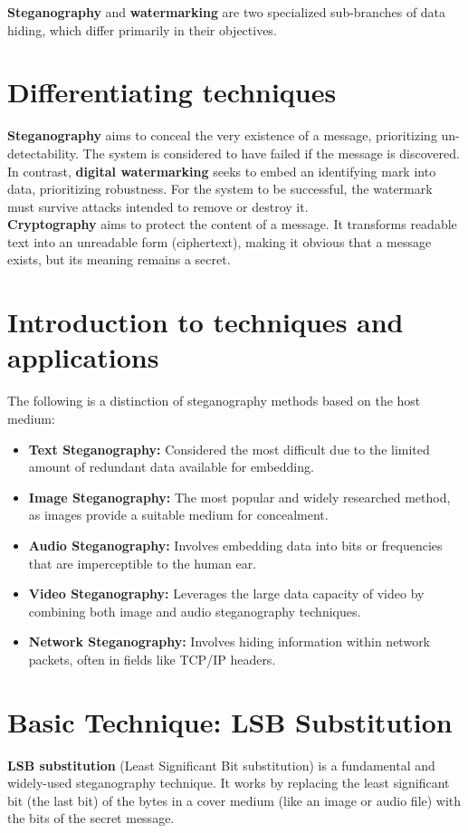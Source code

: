     \textbf{Steganography} and \textbf{watermarking} are two specialized
    sub-branches of data hiding, which differ primarily in their objectives.
\section{Differentiating techniques}
    \textbf{Steganography} aims to conceal the very existence of a message,
    prioritizing un-detectability. The system is considered to have failed if
    the message is discovered.\\
    
    In contrast, \textbf{digital watermarking} seeks to embed an identifying
    mark into data, prioritizing robustness. For the system to be successful,
    the watermark must survive attacks intended to remove or destroy it.\\
    
    \textbf{Cryptography} aims to protect the content of a message. It
    transforms readable text into an unreadable form (ciphertext), making it
    obvious that a message exists, but its meaning remains a secret.
\section{Introduction to techniques and applications}
    The following is a distinction of steganography methods based on the host
    medium:
    \begin{itemize}
        \item \textbf{Text Steganography:} Considered the most difficult due to
            the limited amount of redundant data available for embedding.
        \item \textbf{Image Steganography:} The most popular and widely
            researched method, as images provide a suitable medium for
            concealment.
        \item \textbf{Audio Steganography:} Involves embedding data into bits
            or frequencies that are imperceptible to the human ear.
        \item \textbf{Video Steganography:} Leverages the large data capacity
            of video by combining both image and audio steganography techniques.
        \item \textbf{Network Steganography:} Involves hiding information within
            network packets, often in fields like TCP/IP headers.
    \end{itemize}
\section{Basic Technique: LSB Substitution}
    \textbf{LSB substitution} (Least Significant Bit substitution) is a
    fundamental and widely-used steganography technique. It works by replacing
    the least significant bit (the last bit) of the bytes in a cover medium
    (like an image or audio file) with the bits of the secret message.\\
    
